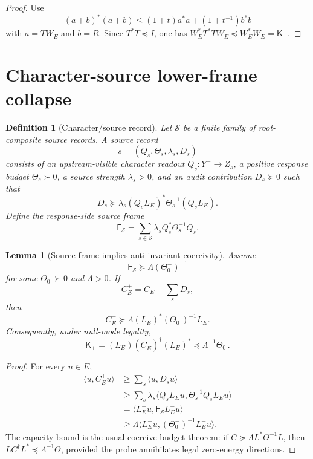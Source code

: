 \documentclass[11pt]{article}
\newtheorem{lemma}[theorem]{Lemma}
\newtheorem{definition}[theorem]{Definition}
\newcommand{\K}{\mathsf K}
\newcommand{\F}{\mathsf F}
\begin{document}
\begin{proof}
Use
\[
  (a+b)^*(a+b)\le (1+t)a^*a+(1+t^{-1})b^*b
\]
with \(a=TW_E\) and \(b=R\).  Since \(T^*T\preceq I\), one has \(W_E^*T^*TW_E\preceq W_E^*W_E=\K^-\).
\end{proof}

\section{Character-source lower-frame collapse}

\begin{definition}[Character/source record]
Let \(\mathcal S\) be a finite family of root-composite source records.  A source record
\[
  s=(Q_s,\Theta_s,\lambda_s,D_s)
\]
consists of an upstream-visible character readout \(Q_s:Y^-\to Z_s\), a positive response budget \(\Theta_s\succ0\), a source strength \(\lambda_s>0\), and an audit contribution \(D_s\succeq0\) such that
\[
  D_s\succeq
  \lambda_s(Q_sL_E^-)^*\Theta_s^{-1}(Q_sL_E^-).
\]
Define the response-side source frame
\[
  \F_{\mathcal S}=\sum_{s\in\mathcal S}\lambda_sQ_s^*\Theta_s^{-1}Q_s.
\]
\end{definition}

\begin{lemma}[Source frame implies anti-invariant coercivity]
Assume
\[
  \F_{\mathcal S}\succeq \Lambda(\Theta_0^-)^{-1}
\]
for some \(\Theta_0^-\succ0\) and \(\Lambda>0\).  If
\[
  C_E^+=C_E+\sum_sD_s,
\]
then
\[
  C_E^+\succeq \Lambda(L_E^-)^*(\Theta_0^-)^{-1}L_E^-.
\]
Consequently, under null-mode legality,
\[
  \K_+^-=(L_E^-) (C_E^+)^\dagger (L_E^-)^*\preceq \Lambda^{-1}\Theta_0^-.
\]
\end{lemma}

\begin{proof}
For every \(u\in E\),
\begin{align*}
  \langle u,C_E^+u\rangle
  &\ge \sum_s\langle u,D_su\rangle \\
  &\ge \sum_s\lambda_s\langle Q_sL_E^-u,\Theta_s^{-1}Q_sL_E^-u\rangle \\
  &= \langle L_E^-u,\F_{\mathcal S}L_E^-u\rangle \\
  &\ge \Lambda\langle L_E^-u,(\Theta_0^-)^{-1}L_E^-u\rangle.
\end{align*}
The capacity bound is the usual coercive budget theorem: if \(C\succeq \Lambda L^*\Theta^{-1}L\), then \(LC^\dagger L^*\preceq \Lambda^{-1}\Theta\), provided the probe annihilates legal zero-energy directions.
\end{proof}
\end{document}
